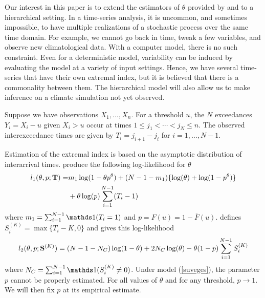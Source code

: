 Our interest in this paper is to extend the estimators of $\theta$ provided by \cite{ferro2003inference} and \cite{suveges2010model} to a hierarchical setting. In a time-series analysis, it is uncommon, and sometimes impossible, to have multiple realizations of a stochastic process over the same time domain. For example, we cannot go back in time, tweak a few variables, and observe new climatological data. With a computer model, there is no such constraint. Even for a deterministic model, variability can be induced by evaluating the model at a variety of input settings. Hence, we have several time-series that have their own extremal index, but it is believed that there is a commonality between them. The hierarchical model will also allow us to make inference on a climate simulation not yet observed.

Suppose we have observations $X_1,\ldots,X_n$. For a threshold $u$, the $N$ exceedances $Y_i=X_i-u$ given $X_i>u$ occur at times $1\leq j_1<\cdots< j_N\leq n$. The observed interexceedance times are given by $T_i=j_{i+1}-j_i$ for $i=1,\ldots,N-1$.

Estimation of the extremal index is based on the asymptotic distribution of interarrival times. \cite{ferro2003inference} produce the following log-likelihood for $\theta$
\begin{align}
l_1(\theta, p; \mathbf{\bm{T}}) =& m_1\log(1-\theta p^\theta) + (N-1-m_1)\{\log(\theta)+ \log(1-p^\theta)\} \nonumber \\
 &+ \theta\log(p)\sum_{i=1}^{N-1}(T_i-1) \label{ferro}
\end{align}
where $m_1=\sum_{i=1}^{N-1}\ind(T_i=1)$ and $p=F(u)=1-\overline{F}(u)$. \cite{suveges2010model} defines $S_i^{(K)}=\max\{T_i-K,0\}$ and gives this log-likelihood
\begin{align}
l_2(\theta, p; \mathbf{\bm{S}}^{(K)})= (N-1-N_C)\log(1-\theta)+2N_C\log(\theta)-\theta (1-p) \sum_{i=1}^{N-1}S_i^{(K)} \label{suveges}
\end{align}
where $N_C=\sum_{i=1}^{N-1}\ind(S_i^{(K)} \neq 0)$. Under model (\ref{suveges}), the parameter $p$ cannot be properly estimated. For all values of $\theta$ and for any threshold, $p\rightarrow 1$. We will then fix $p$ at its empirical estimate.
